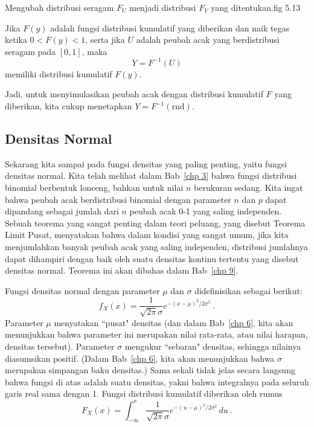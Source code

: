 {Mengubah distribusi seragam $F_{U}$ menjadi distribusi $F_{Y}$ yang ditentukan.}{fig
5.13}%

\begin{corollary}\label{cor 5.2}  Jika $F(y)$ adalah fungsi distribusi kumulatif yang
diberikan dan naik tegas ketika $0 < F(y) < 1$, serta jika $U$ adalah peubah acak
yang berdistribusi seragam pada $[0,1]$, maka
$$ 
Y = F^{-1}(U)
$$ 
memiliki distribusi kumulatif $F(y)$.
\end{corollary}

Jadi, untuk menyimulasikan peubah acak dengan distribusi kumulatif $F$ yang diberikan,
kita cukup menetapkan $Y = F^{-1}(\mbox{rnd})$.

\subsection*{Densitas Normal} 
Sekarang kita sampai pada fungsi densitas yang paling penting, yaitu fungsi densitas
normal.  Kita telah melihat dalam Bab~\ref{chp 3} bahwa fungsi distribusi binomial
berbentuk lonceng, bahkan untuk nilai $n$ berukuran sedang.  Kita ingat bahwa peubah
acak berdistribusi binomial dengan parameter $n$ dan $p$ dapat dipandang sebagai
jumlah dari $n$ peubah acak 0-1 yang saling independen.  Sebuah teorema yang sangat
penting dalam teori peluang, yang disebut Teorema Limit Pusat, menyatakan bahwa dalam
kondisi yang sangat umum, jika kita menjumlahkan banyak peubah acak yang saling
independen, distribusi jumlahnya dapat dihampiri dengan baik oleh suatu densitas
kontinu tertentu yang disebut densitas normal.  Teorema ini akan dibahas dalam
Bab~\ref{chp 9}.
\par
Fungsi densitas normal dengan parameter $\mu$ dan $\sigma$ didefinisikan sebagai berikut:
$$
f_X(x) = \frac 1{\sqrt{2\pi}\sigma} e^{-(x - \mu)^2/2\sigma^2}\ .
$$
Parameter $\mu$ menyatakan ``pusat" densitas (dan dalam Bab~\ref{chp 6}, kita akan
menunjukkan bahwa parameter ini merupakan nilai rata-rata, atau nilai harapan,
densitas tersebut).  Parameter $\sigma$ mengukur ``sebaran" densitas, sehingga
nilainya diasumsikan positif.  (Dalam Bab~\ref{chp 6}, kita akan menunjukkan bahwa
$\sigma$ merupakan simpangan baku densitas.)  Sama sekali tidak jelas secara langsung
bahwa fungsi di atas adalah suatu densitas, yakni bahwa integralnya pada seluruh garis
real sama dengan 1.  Fungsi distribusi kumulatif diberikan oleh rumus
$$ F_X(x) = \int_{-\infty}^x \frac 1{\sqrt{2\pi}\sigma} e^{-(u -
\mu)^2/2\sigma^2}\,du\ .
$$

